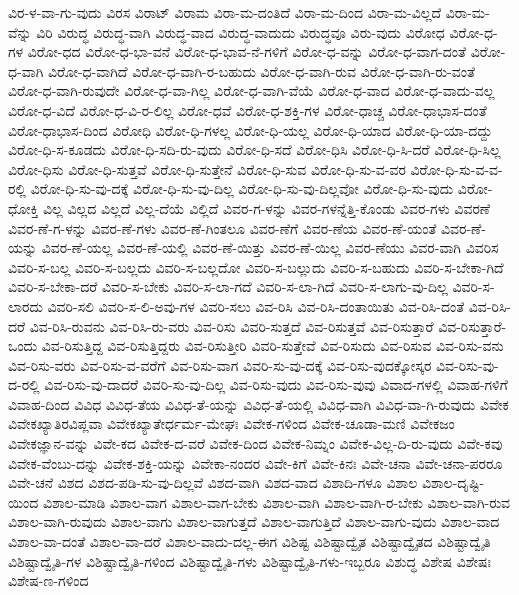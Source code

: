 {ವಿರ-ಳ-ವಾ-ಗು-ವುದು
ವಿರಸ
ವಿರಾಟ್
ವಿರಾಮ
ವಿರಾ-ಮ-ದಂತಿದೆ
ವಿರಾ-ಮ-ದಿಂದ
ವಿರಾ-ಮ-ವಿಲ್ಲದೆ
ವಿರಾ-ಮ-ವೆನ್ನು
ವಿರಿ
ವಿರುದ್ಧ
ವಿರುದ್ಧ-ವಾಗಿ
ವಿರುದ್ಧ-ವಾದ
ವಿರುದ್ಧ-ವಾದುದು
ವಿರುದ್ಧವೂ
ವಿರು-ವುದು
ವಿರೋಧ
ವಿರೋ-ಧ-ಗಳ
ವಿರೋ-ಧದ
ವಿರೋ-ಧ-ಭಾ-ವನೆ
ವಿರೋ-ಧ-ಭಾವ-ನೆ-ಗಳಿಗೆ
ವಿರೋ-ಧ-ವನ್ನು
ವಿರೋ-ಧ-ವಾಗ-ದಂತೆ
ವಿರೋ-ಧ-ವಾಗಿ
ವಿರೋ-ಧ-ವಾಗಿದೆ
ವಿರೋ-ಧ-ವಾಗಿ-ರ-ಬಹುದು
ವಿರೋ-ಧ-ವಾಗಿ-ರುವ
ವಿರೋ-ಧ-ವಾಗಿ-ರು-ವಂತೆ
ವಿರೋ-ಧ-ವಾಗಿ-ರುವುದೇ
ವಿರೋ-ಧ-ವಾ-ಗಿಲ್ಲ
ವಿರೋ-ಧ-ವಾಗಿ-ವೆಯೆ
ವಿರೋ-ಧ-ವಾದ
ವಿರೋ-ಧ-ವಾದು-ವಲ್ಲ
ವಿರೋ-ಧ-ವಿದೆ
ವಿರೋ-ಧ-ವಿ-ರ-ಲಿಲ್ಲ
ವಿರೋ-ಧವೆ
ವಿರೋ-ಧ-ಶಕ್ತಿ-ಗಳ
ವಿರೋ-ಧಾಚ್ಚ
ವಿರೋ-ಧಾಭಾಸ-ದಂತೆ
ವಿರೋ-ಧಾಭಾಸ-ದಿಂದ
ವಿರೋಧಿ
ವಿರೋ-ಧಿ-ಗಳಲ್ಲ
ವಿರೋ-ಧಿ-ಯಲ್ಲ
ವಿರೋ-ಧಿ-ಯಾದ
ವಿರೋ-ಧಿ-ಯಾ-ದದ್ದು
ವಿರೋ-ಧಿ-ಸ-ಕೂಡದು
ವಿರೋ-ಧಿ-ಸದಿ-ರು-ವುದು
ವಿರೋ-ಧಿ-ಸದೆ
ವಿರೋ-ಧಿಸಿ
ವಿರೋ-ಧಿ-ಸಿ-ದರೆ
ವಿರೋ-ಧಿ-ಸಿಲ್ಲ
ವಿರೋ-ಧಿಸು
ವಿರೋ-ಧಿ-ಸುತ್ತವೆ
ವಿರೋ-ಧಿ-ಸುತ್ತೇನೆ
ವಿರೋ-ಧಿ-ಸುವ
ವಿರೋ-ಧಿ-ಸು-ವ-ವರ
ವಿರೋ-ಧಿ-ಸು-ವ-ವ-ರಲ್ಲಿ
ವಿರೋ-ಧಿ-ಸು-ವು-ದಕ್ಕೆ
ವಿರೋ-ಧಿ-ಸು-ವು-ದಿಲ್ಲ
ವಿರೋ-ಧಿ-ಸು-ವು-ದಿಲ್ಲವೋ
ವಿರೋ-ಧಿ-ಸು-ವುದು
ವಿರೋ-ಧೋಕ್ತಿ
ವಿಲ್ಲ
ವಿಲ್ಲದ
ವಿಲ್ಲದೆ
ವಿಲ್ಲ-ದೆಯೆ
ವಿಲ್ಲಿದೆ
ವಿವರ-ಗ-ಳನ್ನು
ವಿವರ-ಗಳನ್ನೆತ್ತಿ-ಕೊಂಡು
ವಿವರ-ಗಳು
ವಿವರಣೆ
ವಿವರ-ಣೆ-ಗ-ಳನ್ನು
ವಿವರ-ಣೆ-ಗಳು
ವಿವರ-ಣೆ-ಗಿಂತಲೂ
ವಿವರ-ಣೆಗೆ
ವಿವರ-ಣೆಯ
ವಿವರ-ಣೆ-ಯಂತೆ
ವಿವರ-ಣೆ-ಯನ್ನು
ವಿವರ-ಣೆ-ಯಲ್ಲ
ವಿವರ-ಣೆ-ಯಲ್ಲಿ
ವಿವರ-ಣೆ-ಯಿತ್ತು
ವಿವರ-ಣೆ-ಯಿಲ್ಲ
ವಿವರ-ಣೆಯು
ವಿವರ-ವಾಗಿ
ವಿವರಿಸ
ವಿವರಿ-ಸ-ಬಲ್ಲ
ವಿವರಿ-ಸ-ಬಲ್ಲದು
ವಿವರಿ-ಸ-ಬಲ್ಲದೋ
ವಿವರಿ-ಸ-ಬಲ್ಲುದು
ವಿವರಿ-ಸ-ಬಹುದು
ವಿವರಿ-ಸ-ಬೇಕಾ-ಗಿದೆ
ವಿವರಿ-ಸ-ಬೇಕಾ-ದರೆ
ವಿವರಿ-ಸ-ಬೇಕು
ವಿವರಿ-ಸ-ಲಾ-ಗದೆ
ವಿವರಿ-ಸ-ಲಾ-ಗಿದೆ
ವಿವರಿ-ಸ-ಲಾಗು-ವು-ದಿಲ್ಲ
ವಿವರಿ-ಸ-ಲಾರದು
ವಿವರಿ-ಸಲಿ
ವಿವರಿ-ಸ-ಲಿ-ಅವು-ಗಳ
ವಿವರಿ-ಸಲು
ವಿವ-ರಿಸಿ
ವಿವ-ರಿಸಿ-ದಂತಾಯಿತು
ವಿವ-ರಿಸಿ-ದಂತೆ
ವಿವ-ರಿಸಿ-ದರೆ
ವಿವ-ರಿಸಿ-ರುವನು
ವಿವ-ರಿಸಿ-ರು-ವರು
ವಿವ-ರಿಸು
ವಿವರಿ-ಸುತ್ತದೆ
ವಿವ-ರಿಸುತ್ತವೆ
ವಿವ-ರಿಸುತ್ತಾರೆ
ವಿವ-ರಿಸುತ್ತಾರೆ-ಒಂದು
ವಿವ-ರಿಸುತ್ತಿದ್ದ
ವಿವ-ರಿಸುತ್ತಿದ್ದರು
ವಿವ-ರಿಸುತ್ತೀರಿ
ವಿವರಿ-ಸುತ್ತೇವೆ
ವಿವ-ರಿಸುದು
ವಿವ-ರಿಸುವ
ವಿವ-ರಿಸು-ವನು
ವಿವ-ರಿಸು-ವರು
ವಿವ-ರಿಸು-ವ-ವರೆಗೆ
ವಿವ-ರಿಸು-ವಾಗ
ವಿವರಿ-ಸು-ವು-ದಕ್ಕೆ
ವಿವ-ರಿಸು-ವುದಕ್ಕೋಸ್ಕರ
ವಿವ-ರಿಸು-ವು-ದ-ರಲ್ಲಿ
ವಿವ-ರಿಸು-ವು-ದಾದರೆ
ವಿವರಿ-ಸು-ವು-ದಿಲ್ಲ
ವಿವ-ರಿಸು-ವುದು
ವಿವ-ರಿಸು-ವುವು
ವಿವಾದ-ಗಳಲ್ಲಿ
ವಿವಾಹ-ಗಳಿಗೆ
ವಿವಾಹ-ದಿಂದ
ವಿವಿಧ
ವಿವಿಧ-ತೆಯ
ವಿವಿಧ-ತೆ-ಯನ್ನು
ವಿವಿಧ-ತೆ-ಯಲ್ಲಿ
ವಿವಿಧ-ವಾಗಿ
ವಿವಿಧ-ವಾ-ಗಿ-ರುವುದು
ವಿವೇಕ
ವಿವೇಕಖ್ಯಾತಿರವಿಪ್ಲವಾ
ವಿವೇಕಖ್ಯಾತೇರ್ಧರ್ಮ-ಮೇಘಃ
ವಿವೇಕ-ಗಳಿಂದ
ವಿವೇಕ-ಚೂಡಾ-ಮಣಿ
ವಿವೇಕಜಂ
ವಿವೇಕಜ್ಞಾನ-ವನ್ನು
ವಿವೇ-ಕದ
ವಿವೇಕ-ದ-ವರೆ
ವಿವೇಕ-ದಿಂದ
ವಿವೇಕ-ನಿಮ್ನಂ
ವಿವೇಕ-ವಿಲ್ಲ-ದಿ-ರು-ವುದು
ವಿವೇ-ಕವು
ವಿವೇಕ-ವೆಂಬು-ದನ್ನು
ವಿವೇಕ-ಶಕ್ತಿ-ಯನ್ನು
ವಿವೇಕಾ-ನಂದರ
ವಿವೇ-ಕಿಗೆ
ವಿವೇ-ಕಿನಃ
ವಿವೇ-ಚನಾ
ವಿವೇ-ಚನಾ-ಪರರೂ
ವಿವೇ-ಚನೆ
ವಿಶದ
ವಿಶದ-ಪಡಿ-ಸು-ವು-ದಿಲ್ಲವೆ
ವಿಶದ-ವಾಗಿ
ವಿಶದ-ವಾದ
ವಿಶಾದಿ-ಗಳೂ
ವಿಶಾಲ
ವಿಶಾಲ-ದೃಷ್ಟಿ-ಯಿಂದ
ವಿಶಾಲ-ಮಾಡಿ
ವಿಶಾಲ-ವಾಗ
ವಿಶಾಲ-ವಾಗ-ಬೇಕು
ವಿಶಾಲ-ವಾಗಿ
ವಿಶಾಲ-ವಾಗಿ-ರ-ಬೇಕು
ವಿಶಾಲ-ವಾಗಿ-ರುವ
ವಿಶಾಲ-ವಾಗಿ-ರುವುದು
ವಿಶಾಲ-ವಾಗು
ವಿಶಾಲ-ವಾಗುತ್ತದೆ
ವಿಶಾಲ-ವಾಗುತ್ತಿದೆ
ವಿಶಾಲ-ವಾಗು-ವುದು
ವಿಶಾಲ-ವಾದ
ವಿಶಾಲ-ವಾ-ದಂತೆ
ವಿಶಾಲ-ವಾ-ದರೆ
ವಿಶಾಲ-ವಾದು-ದಲ್ಲ-ಈಗ
ವಿಶಿಷ್ಟ
ವಿಶಿಷ್ಟಾದ್ವೈತ
ವಿಶಿಷ್ಟಾದ್ವೈತದ
ವಿಶಿಷ್ಟಾದ್ವೈತಿ
ವಿಶಿಷ್ಟಾದ್ವೈತಿ-ಗಳ
ವಿಶಿಷ್ಟಾದ್ವೈತಿ-ಗಳಿಂದ
ವಿಶಿಷ್ಟಾದ್ವೈತಿ-ಗಳು
ವಿಶಿಷ್ಟಾದ್ವೈತಿ-ಗಳು-ಇಬ್ಬರೂ
ವಿಶುದ್ಧ
ವಿಶೇಷ
ವಿಶೇಷಃ
ವಿಶೇಷ-ಣ-ಗಳಿಂದ
}

